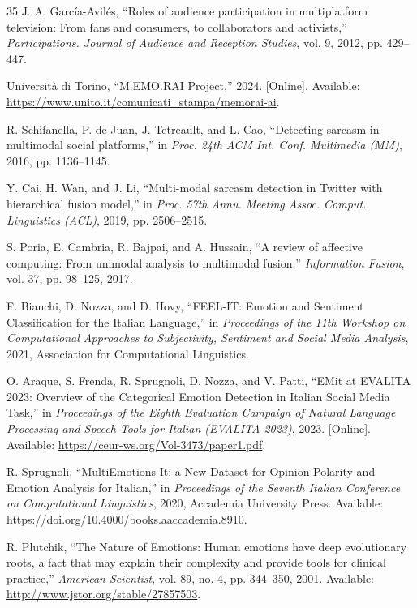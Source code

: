 \documentclass[letterpaper,journal]{IEEEtran}
\begin{document}
\begin{thebibliography}{35}
 J. A. Garc\'ia-Avil\'es, ``Roles of audience participation in multiplatform television: From fans and consumers, to collaborators and activists,'' \textit{Participations. Journal of Audience and Reception Studies}, vol. 9, 2012, pp. 429--447.

 Universit\`a di Torino, ``M.EMO.RAI Project,'' 2024. [Online]. Available: \url{https://www.unito.it/comunicati_stampa/memorai-ai}.

 R. Schifanella, P. de Juan, J. Tetreault, and L. Cao, ``Detecting sarcasm in multimodal social platforms,'' in \textit{Proc. 24th ACM Int. Conf. Multimedia (MM)}, 2016, pp. 1136--1145.

 Y. Cai, H. Wan, and J. Li, ``Multi-modal sarcasm detection in Twitter with hierarchical fusion model,'' in \textit{Proc. 57th Annu. Meeting Assoc. Comput. Linguistics (ACL)}, 2019, pp. 2506--2515.

 S. Poria, E. Cambria, R. Bajpai, and A. Hussain, ``A review of affective computing: From unimodal analysis to multimodal fusion,'' \textit{Information Fusion}, vol. 37, pp. 98--125, 2017.

 F. Bianchi, D. Nozza, and D. Hovy, ``FEEL-IT: Emotion and Sentiment Classification for the Italian Language,'' in \textit{Proceedings of the 11th Workshop on Computational Approaches to Subjectivity, Sentiment and Social Media Analysis}, 2021, Association for Computational Linguistics.

 O. Araque, S. Frenda, R. Sprugnoli, D. Nozza, and V. Patti, ``EMit at EVALITA 2023: Overview of the Categorical Emotion Detection in Italian Social Media Task,'' in \textit{Proceedings of the Eighth Evaluation Campaign of Natural Language Processing and Speech Tools for Italian (EVALITA 2023)}, 2023. [Online]. Available: \url{https://ceur-ws.org/Vol-3473/paper1.pdf}.

 R. Sprugnoli, ``MultiEmotions-It: a New Dataset for Opinion Polarity and Emotion Analysis for Italian,'' in \textit{Proceedings of the Seventh Italian Conference on Computational Linguistics}, 2020, Accademia University Press. Available: \url{https://doi.org/10.4000/books.aaccademia.8910}.

 R. Plutchik, ``The Nature of Emotions: Human emotions have deep evolutionary roots, a fact that may explain their complexity and provide tools for clinical practice,'' \textit{American Scientist}, vol. 89, no. 4, pp. 344--350, 2001. Available: \url{http://www.jstor.org/stable/27857503}.


\end{thebibliography}
\end{document}
